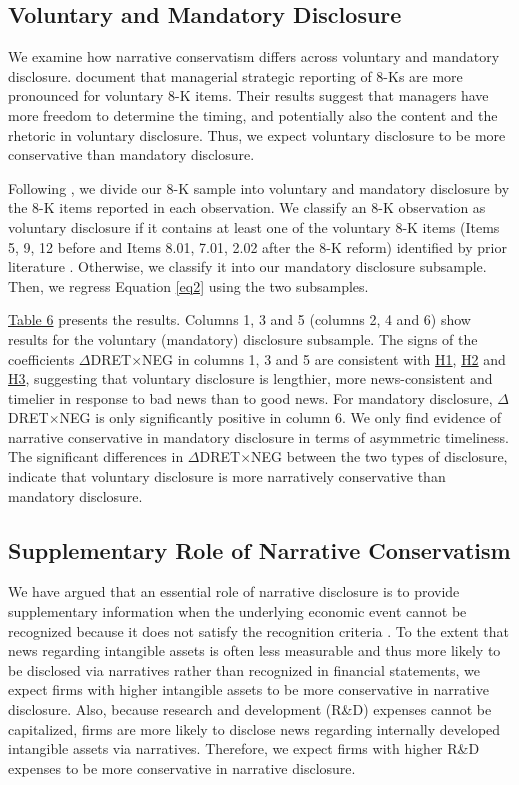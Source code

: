 \documentclass[letterpaper,12pt]{article}
\begin{document}
\begin{spacing}{1.5}
\subsection{Voluntary and Mandatory Disclosure}
\noindent We examine how narrative conservatism differs across voluntary and mandatory disclosure.  document that managerial strategic reporting of 8-Ks are more pronounced for voluntary 8-K items. Their results suggest that managers have more freedom to determine the timing, and potentially also the content and the rhetoric in voluntary disclosure. Thus, we expect voluntary disclosure to be more conservative than mandatory disclosure.

Following , we divide our 8-K sample into voluntary and mandatory disclosure by the 8-K items reported in each observation. We classify an 8-K observation as voluntary disclosure if it contains at least one of the voluntary 8-K items (Items 5, 9, 12 before and Items 8.01, 7.01, 2.02 after the 8-K reform) identified by prior literature \cite{lermanNewForm8K2010, heMeasuringDisclosureUsing2020}. Otherwise, we classify it into our mandatory disclosure subsample. Then, we regress Equation \eqref{eq2} using the two subsamples. 

\hyperref[T6]{Table 6} presents the results. Columns 1, 3 and 5 (columns 2, 4 and 6) show results for the voluntary (mandatory) disclosure subsample. The signs of the coefficients $\Delta$DRET$\times$NEG in columns 1, 3 and 5 are consistent with \hyperref[h1]{H1}, \hyperref[h2]{H2} and \hyperref[h3]{H3}, suggesting that voluntary disclosure is lengthier, more news-consistent and timelier in response to bad news than to good news. For mandatory disclosure, $\Delta$DRET$\times$NEG is only significantly positive in column 6. We only find evidence of narrative conservative in mandatory disclosure in terms of asymmetric timeliness. The significant differences in $\Delta$DRET$\times$NEG between the two types of disclosure, indicate that voluntary disclosure is more narratively conservative than mandatory disclosure.

\subsection{Supplementary Role of Narrative Conservatism}
\noindent We have argued that an essential role of narrative disclosure is to provide supplementary information when the underlying economic event cannot be recognized because it does not satisfy the recognition criteria \cite{fasbStatementFinancialAccounting1984}. To the extent that news regarding intangible assets is often less measurable and thus more likely to be disclosed via narratives rather than recognized in financial statements, we expect firms with higher intangible assets to be more conservative in narrative disclosure. Also, because research and development (R\&D) expenses cannot be capitalized, firms are more likely to disclose news regarding internally developed intangible assets via narratives. Therefore, we expect firms with higher R\&D expenses to be more conservative in narrative disclosure.


\end{spacing}
\end{document}

